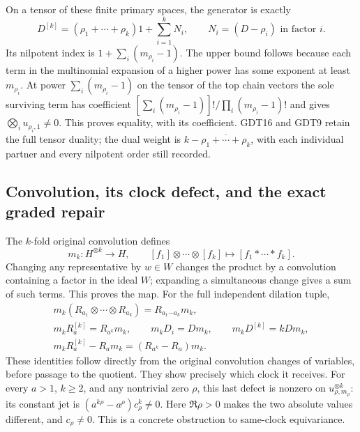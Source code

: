 On a tensor of these finite primary spaces, the
generator is exactly
\begin{equation}\tag{GDT17}
 D^{[k]}=
 (\rho_1+\cdots+\rho_k)1+
 \sum_{i=1}^k N_i,\qquad
 N_i=(D-\rho_i)\text{ in factor }i .
\end{equation}
Its nilpotent index is
$1+\sum_i(m_{\rho_i}-1)$.
The upper bound follows because each term in the
multinomial expansion of a higher power has some
exponent at least $m_{\rho_i}$.
At power $\sum_i(m_{\rho_i}-1)$ on the tensor of
the top chain vectors the sole surviving term
has coefficient
$[\sum_i(m_{\rho_i}-1)]!/\prod_i(m_{\rho_i}-1)!$
and gives $\bigotimes_i u_{\rho_i,1}\ne0$.
This proves equality, with its coefficient.
GDT16 and GDT9 retain the full tensor duality;
the dual weight is $k-\overline{\rho_1+\cdots+\rho_k}$,
with each individual partner and every nilpotent
order still recorded.

\subsection{Convolution, its clock defect, and the exact graded repair}

The $k$-fold original convolution defines
\begin{equation}\tag{GDT18}
 m_k:H^{\otimes k}\longrightarrow H,\qquad
 [f_1]\otimes\cdots\otimes[f_k]
                   \longmapsto[f_1*\cdots*f_k].
\end{equation}
Changing any representative by $w\in W$ changes the
product by a convolution containing a factor in
the ideal $W$; expanding a simultaneous change
gives a sum of such terms. This proves the map.
For the full independent dilation tuple,
\begin{equation}\tag{GDT19}
 \begin{gathered}
 m_k(R_{a_1}\otimes\cdots\otimes R_{a_k})
              =R_{a_1\cdots a_k}m_k,\\
 m_kR_a^{[k]}=R_{a^k}m_k,\qquad
 m_kD_i=Dm_k,\qquad m_kD^{[k]}=kDm_k,\\
 m_kR_a^{[k]}-R_am_k=(R_{a^k}-R_a)m_k.
 \end{gathered}
\end{equation}
These identities follow directly from the original
convolution changes of variables, before passage to
the quotient. They show precisely which clock it
receives.
For every $a>1$, $k\ge2$, and any nontrivial zero
$\rho$, this last defect is nonzero on
$u_{\rho,m_\rho}^{\otimes k}$:
its constant jet is
$(a^{k\rho}-a^\rho)c_\rho^k\ne0$.
Here $\Re\rho>0$ makes the two absolute values
different, and $c_\rho\ne0$. This is a concrete
obstruction to same-clock equivariance.

